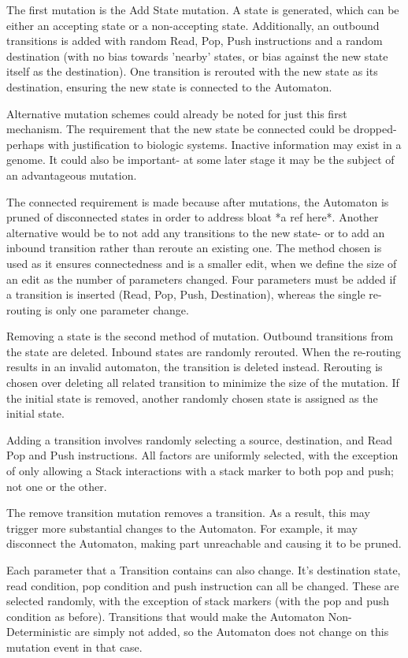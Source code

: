 \documentclass[a4paper,11pt,bcshonoursthesis,singlespace,twoside,thesisdraft,pdflatex]{cssethesis}
\begin{document}
The first mutation is the Add State mutation. A state is generated, which can be either an accepting state or a non-accepting state. Additionally, an outbound transitions is added with random Read, Pop, Push instructions and a random destination (with no bias towards 'nearby' states, or bias against the new state itself as the destination). One transition is rerouted with the new state as its destination, ensuring the new state is connected to the Automaton. 

Alternative mutation schemes could already be noted for just this first mechanism. 
The requirement that the new state be connected could be dropped- perhaps with justification to biologic systems. Inactive information may exist in a genome. 
It could also be important- at some later stage it may be the subject of an advantageous mutation. 

The connected requirement is made because after mutations, the Automaton is pruned of disconnected states in order to address bloat *a ref here*. 
Another alternative would be to not add any transitions to the new state- or to add an inbound transition rather than reroute an existing one. The method chosen is used as it ensures connectedness and is a smaller edit, when we define the size of an edit as the number of parameters changed. Four parameters must be added if a transition is inserted (Read, Pop, Push, Destination), whereas the single re-routing is only one parameter change.

Removing a state is the second method of mutation. Outbound transitions from the state are deleted. 
Inbound states are randomly rerouted. When the re-routing results in an invalid automaton, the transition is deleted instead. Rerouting is chosen over deleting all related transition to minimize the size of the mutation. If the initial state is removed, another randomly chosen state is assigned as the initial state.

Adding a transition involves randomly selecting a source, destination, and Read Pop and Push instructions. All factors are uniformly selected, with the exception of only allowing a Stack interactions with a stack marker to both pop and push; not one or the other. 

The remove transition mutation removes a transition. As a result, this may trigger more substantial changes to the Automaton. For example, it may disconnect the Automaton, making part unreachable and causing it to be pruned. 

Each parameter that a Transition contains can also change. It's destination state, read condition, pop condition and push instruction can all be changed. These are selected randomly, with the exception of stack markers (with the pop and push condition as before). Transitions that would make the Automaton Non-Deterministic are simply not added, so the Automaton does not change on this mutation event in that case.
\end{document}
